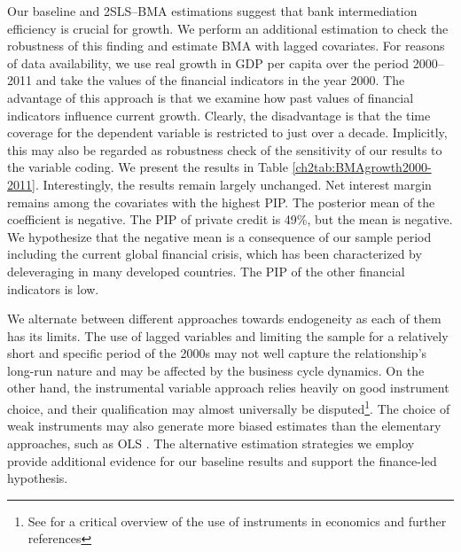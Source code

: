 \begin{refsection}
Our baseline and 2SLS--BMA estimations suggest that bank intermediation efficiency is crucial for growth. We perform an additional estimation to check the robustness of this finding and estimate \ac{BMA} with lagged covariates. For reasons of data availability, we use real growth in GDP per capita over the period 2000--2011 and take the values of the financial indicators in the year 2000. The advantage of this approach is that we examine how past values of financial indicators influence current growth. Clearly, the disadvantage is that the time coverage for the dependent variable is restricted to just over a decade. Implicitly, this may also be regarded as robustness check of the sensitivity of our results to the variable coding. We present the results in Table \ref{ch2tab:BMAgrowth2000-2011}. Interestingly, the results remain largely unchanged. Net interest margin remains among the covariates with the highest \ac{PIP}. The posterior mean of the coefficient is negative. The \ac{PIP} of private credit is 49\%, but the mean is negative. We hypothesize that the negative mean is a consequence of our sample period including the current global financial crisis, which has been characterized by deleveraging in many developed countries. The \ac{PIP} of the other financial indicators is low.

We alternate between different approaches towards endogeneity as each of them has its limits. The use of lagged variables and limiting the sample for a relatively short and specific period of the 2000s may not well capture the relationship's long-run nature and may be affected by the business cycle dynamics. On the other hand, the instrumental variable approach relies heavily on good instrument choice, and their qualification may almost universally be disputed\footnote{See \textcite{deaton2010instruments} for a critical overview of the use of instruments in economics and further references}. The choice of weak instruments may also generate more biased estimates than the elementary approaches, such as OLS \parencite{bazzi2013blunt}. The alternative estimation strategies we employ provide additional evidence for our baseline results and support the finance-led hypothesis.


\end{refsection}
